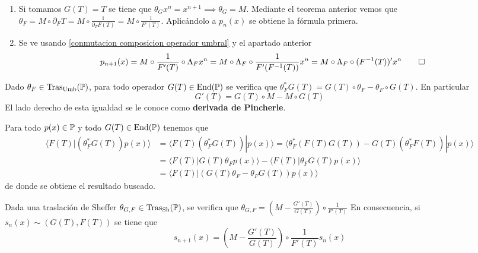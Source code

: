 \begin{demo}
    \begin{enumerate}
        \item Si tomamos $G(T) = T$ se tiene que $\theta_G x^n = x^{n+1} \implies \theta_G = M$. Mediante el teorema anterior vemos que $\theta_F = M \circ \partial_F T = M \circ \frac{1}{\partial_T F(T)} = M \circ \frac{1}{F'(T)}$. Aplicándolo a $p_n(x)$ se obtiene la fórmula primera.

        \item Se ve usando \ref{conmutacion composicion operador umbral} y el apartado anterior
        \begin{align*}
            p_{n+1}(x) = M \circ \frac{1}{F'(T)} \circ \Lambda_F x^n & = M \circ \Lambda_F \circ \frac{1}{F'(F^{-1}(T))} x^n = M \circ \Lambda_F \circ (F^{-1}(T))' x^n \qedhere
        \end{align*}
    \end{enumerate}
\end{demo}

\begin{teorema}
    Dado $\theta_F \in \operatorname*{Tras_{Umb}(\mathbb{P})}$, para todo operador $G(T) \in \operatorname*{End}(\mathbb{P})$ se verifica que $\theta_F^* G(T) = G(T) \circ \theta_F - \theta_F \circ G(T)$. En particular
    \begin{equation*}
        G'(T) = G(T) \circ M - M \circ G(T)
    \end{equation*}
    El lado derecho de esta igualdad se le conoce como \textbf{derivada de Pincherle}.
\end{teorema}

\begin{demo}
    Para todo $p(x) \in \mathbb{P}$ y todo $G(T) \in \operatorname*{End}(\mathbb{P})$ tenemos que
    \begin{align*}
        \langle F(T) | (\theta_F^* G(T)) p(x)\rangle & = \langle F(T)(\theta_F^* G(T)) | p(x)\rangle = \langle \theta_F^* (F(T) G(T)) - G(T) (\theta_F^* F(T)) | p(x)\rangle \\
        & = \langle F(T) | G(T) \theta_F p(x)\rangle - \langle F(T) | \theta_F G(T) p(x)\rangle \\
        & = \langle F(T) | (G(T) \theta_F - \theta_F G(T))p(x)\rangle 
    \end{align*}
    de donde se obtiene el resultado buscado.
\end{demo}

\begin{teorema}\label{recurrencia sheffer}
    Dada una traslación de Sheffer $\theta_{G,F} \in \operatorname*{Tras_{Sh}(\mathbb{P})}$, se verifica que $\theta_{G,F} = (M - \frac{G'(T)}{G(T)}) \circ \frac{1}{F'(T)}$
    En consecuencia, si $s_n(x) \sim (G(T), F(T))$ se tiene que
    \begin{equation*}
        s_{n+1}(x) = \left(M - \frac{G'(T)}{G(T)}\right) \circ \frac{1}{F'(T)}s_n(x)
    \end{equation*}
\end{teorema}

